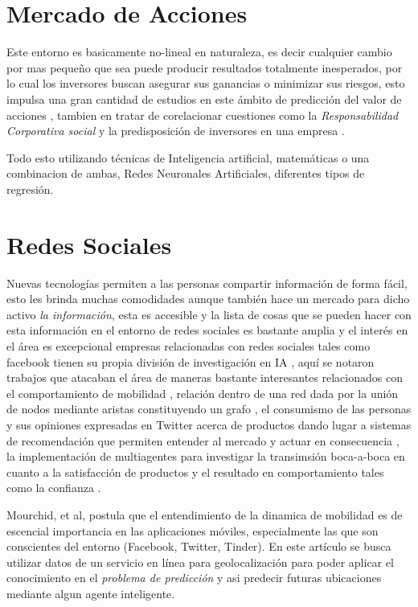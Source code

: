 \documentclass{article}
\begin{document}
\section{Mercado de Acciones}
\label{sec:stock}
Este entorno es basicamente no-lineal en naturaleza, es decir cualquier cambio por mas pequeño que sea puede producir resultados totalmente inesperados, por lo cual los inversores buscan asegurar sus ganancias o minimizar sus riesgos, esto impulsa una gran cantidad de estudios en este \'ambito de predicci\'on del valor de acciones \cite{somani2014} \cite{sharma2017} \cite{srinivasan2017}, tambien en tratar de corelacionar cuestiones como la \textit{Responsabilidad Corporativa social} y la predisposici\'on de inversores en una empresa \cite{sukthomya2018}.

Todo esto utilizando t\'ecnicas de Inteligencia artificial, matem\'aticas o una combinacion de ambas, Redes Neuronales Artificiales, diferentes tipos de regresi\'on.

\section{Redes Sociales}
\label{sec:social}
Nuevas tecnolog\'ias permiten a las personas compartir informaci\'on de forma f\'acil, esto les brinda muchas comodidades aunque tambi\'en hace un mercado para dicho activo \textit{la informaci\'on}, esta es accesible y la lista de cosas que se pueden hacer con esta informaci\'on en el entorno de redes sociales es bastante amplia y el inter\'es en el \'area es excepcional empresas relacionadas con redes sociales tales como facebook tienen su propia divisi\'on de investigaci\'on en IA \cite{facebookr}, aqu\'i se notaron trabajos que atacaban el \'area de maneras bastante interesantes relacionados con el comportamiento de mobilidad \cite{mourchid2014}, relaci\'on dentro de una red dada por la uni\'on de nodos mediante aristas constituyendo un grafo \cite{mohamadyari2017}, el consumismo de las personas y sus opiniones expresadas en Twitter acerca de productos dando lugar a sistemas de recomendaci\'on que permiten entender al mercado y actuar en consecuencia \cite{garcia2017}, la implementaci\'on de multiagentes para investigar la transimsi\'on boca-a-boca en cuanto a la satisfacci\'on de productos y el resultado en comportamiento tales como la confianza \cite{durbach2007}.

Mourchid, et al, postula que el entendimiento de la dinamica de mobilidad es de escencial importancia en las aplicaciones m\'oviles, especialmente las que son conscientes del entorno (Facebook, Twitter, Tinder). En este art\'iculo se busca utilizar datos de un servicio en l\'inea para geolocalizaci\'on para poder aplicar el conocimiento en el \textit{problema de predicci\'on} y asi predecir futuras ubicaciones mediante algun agente inteligente.
\end{document}
